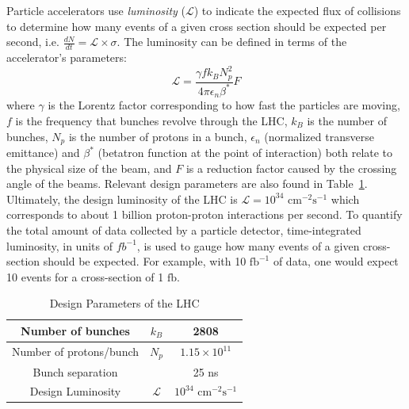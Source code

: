 Particle accelerators use \textit{luminosity} ($\mathcal{L}$) to indicate the expected flux of collisions to determine how many events of a given cross section should be expected per second, i.e. $\frac{dN}{dt}=\mathcal{L}\times\sigma$. The luminosity can be defined in terms of the accelerator's parameters:
\begin{equation*}
\mathcal{L} = \frac{\gamma f k_{B}N_p^2}{4\pi \epsilon_{n} \beta^{*}}F
\end{equation*}
where $\gamma$ is the Lorentz factor corresponding to how fast the particles are moving, $f$ is the frequency that bunches revolve through the LHC, $k_{B}$ is the number of bunches, $N_p$ is the number of protons in a bunch, $\epsilon_n$ (normalized transverse emittance) and $\beta^{*}$ (betatron function at the point of interaction) both relate to the physical size of the beam, and $F$ is a reduction factor caused by the crossing angle of the beams. Relevant design parameters are also found in Table~\ref{tbl:LHCLumi}. Ultimately, the design luminosity of the LHC is $\mathcal{L} = 10^{34}$ $\mathrm{cm}^{-2}\mathrm{s}^{-1}$ which corresponds to about 1 billion proton-proton interactions per second. To quantify the total amount of data collected by a particle detector, time-integrated luminosity, in units of $fb^{-1}$, is used to gauge how many events of a given cross-section should be expected. For example, with 10 $\mathrm{fb}^{-1}$ of data, one would expect 10 events for a cross-section of 1 $\mathrm{fb}$.

\begin{table}[htp]
\begin{center}
\begin{tabular}{|c|c|c|}
\hline
Number of bunches & $k_B$ & 2808 \\
\hline
Number of protons/bunch & $N_p$ & $1.15\times10^{11}$ \\
\hline
Bunch separation & & 25 ns \\
\hline
Design Luminosity & $\mathcal{L}$ & $10^{34}$ $\mathrm{cm}^{-2}\mathrm{s}^{-1}$ \\
\hline
\end{tabular}
\caption{Design Parameters of the LHC\label{tbl:LHCLumi}}
\end{center}
\end{table}%

